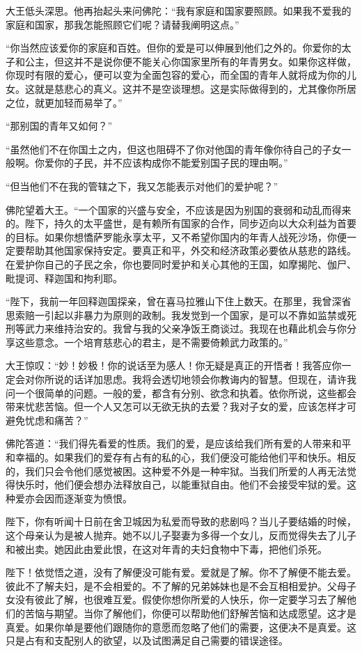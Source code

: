 \documentclass[12pt,twoside,openany]{book}
\begin{document}
大王低头深思。他再抬起头来问佛陀：“我有家庭和国家要照顾。如果我不爱我的家庭和国家，那我怎能照顾它们呢？请替我阐明这点。”

“你当然应该爱你的家庭和百姓。但你的爱是可以伸展到他们之外的。你爱你的太子和公主，但这并不是说你便不能关心你国家里所有的年青男女。如果你这样做，你现时有限的爱心，便可以变为全面包容的爱心，而全国的青年人就将成为你的儿女。这就是慈悲心的真义。这并不是空谈理想。这是实际做得到的，尤其像你所居之位，就更加轻而易举了。”

“那别国的青年又如何？”

“虽然他们不在你国土之内，但这也阻碍不了你对他国的青年像你待自己的子女一般啊。你爱你的子民，并不应该构成你不能爱别国子民的理由啊。”

“但当他们不在我的管辖之下，我又怎能表示对他们的爱护呢？”

佛陀望着大王。“一个国家的兴盛与安全，不应该是因为别国的衰弱和动乱而得来的。陛下，持久的太平盛世，是有赖所有国家的合作，同步迈向以大众利益为首要的目标。如果你想憍萨罗能永享太平，又不希望你国内的年青人战死沙场，你便一定要帮助其他国家保持安定。要真正和平，外交和经济政策必要依从慈悲的路线。在爱护你自己的子民之余，你也要同时爱护和关心其他的王国，如摩揭陀、伽尸、毗提诃、释迦国和拘利耶。

“陛下，我前一年回释迦国探亲，曾在喜马拉雅山下住上数天。在那里，我曾深省思索赔一引起以非暴力为原则的政制。我发觉到一个国家，是可以不靠如监禁或死刑等武力来维持治安的。我曾与我的父亲净饭王商谈过。我现在也藉此机会与你分享这些意念。一个培育慈悲心的君主，是不需要倚赖武力政策的。”

大王惊叹：“妙！妙极！你的说话至为感人！你无疑是真正的开悟者！我答应你一定会对你所说的话详加思虑。我将会透切地领会你教诲内的智慧。但现在，请许我问一个很简单的问题。一般的爱，都含有分别、欲念和执着。依你所说，这些都会带来忧悲苦恼。但一个人又怎可以无欲无执的去爱？我对子女的爱，应该怎样才可避免忧虑和痛苦？”

佛陀答道：“我们得先看爱的性质。我们的爱，是应该给我们所有爱的人带来和平和幸福的。如果我们的爱存有占有的私的心，我们便没可能给他们平和快乐。相反的，我们只会令他们感觉被困。这种爱不外是一种牢狱。当我们所爱的人再无法觉得快乐时，他们便会想办法释放自己，以能重狱自由。他们不会接受牢狱的爱。这种爱亦会因而逐渐变为愤恨。

陛下，你有听闻十日前在舍卫城因为私爱而导致的悲剧吗？当儿子要结婚的时候，这个母亲认为是被人抛弃。她不以儿子娶妻为多得一个女儿，反而觉得失去了儿子和被出卖。她因此由爱此恨，在这对年青的夫妇食物中下毒，把他们杀死。

陛下！依觉悟之道，没有了解便没可能有爱。爱就是了解。你不了解便不能去爱。彼此不了解夫妇，是不会相爱的。不了解的兄弟姊妹也是不会互相相爱护。父母子女没有彼此了解，也很难互爱。假使你想你所爱的人快乐，你一定要学习去了解他们的苦恼与期望。当你了解他们，你便可以帮助他们舒解苦恼和达成愿望。这才是真爱。如果你单是要他们跟随你的意愿而忽略了他们的需要，这便决不是真爱。这只是占有和支配别人的欲望，以及试图满足自己需要的错误途径。
\end{document}
